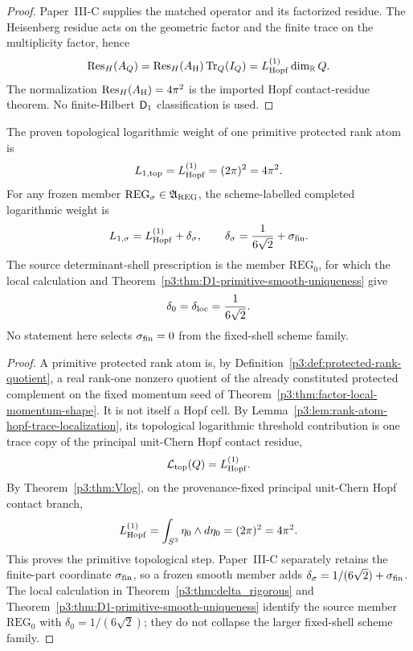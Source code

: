 \documentclass[12pt,a4paper]{article}
\begin{document}
\begin{proof}
Paper~III-C supplies the matched operator and its factorized residue.  The
Heisenberg residue acts on the geometric factor and the finite trace on the
multiplicity factor, hence
\[
 \operatorname{Res}_{H}(A_Q)
 =\operatorname{Res}_{H}(A_{\rm H})\operatorname{Tr}_Q(I_Q)
 =L_{\mathrm{Hopf}}^{(1)}\dim_{\mathbb R}Q.
\]
The normalization \(\operatorname{Res}_{H}(A_{\rm H})=4\pi^2\) is the
imported Hopf contact-residue theorem.  No finite-Hilbert \(\mathsf{D}_1\)
classification is used.
\end{proof}

\begin{lemma}
\label{p3:lem:primitive-hopf-cell-normalization}
The proven topological logarithmic weight of one primitive protected rank atom is
\[
L_{1,{\rm top}}=L_{\mathrm{Hopf}}^{(1)}=(2\pi)^2=4\pi^2.
\]
For any frozen member \(\mathrm{REG}_{\sigma}\in\mathfrak A_{\rm REG}\), the
scheme-labelled completed logarithmic weight is
\[
 L_{1,\sigma}=L_{\mathrm{Hopf}}^{(1)}+\delta_\sigma,
 \qquad
 \delta_\sigma=\frac1{6\sqrt2}+\sigma_{\rm fin}.
\]
The source determinant-shell prescription is the member
\(\mathrm{REG}_0\), for which the local calculation and
Theorem~\ref{p3:thm:D1-primitive-smooth-uniqueness} give
\[
 \delta_0=\delta_{\rm loc}=\frac1{6\sqrt2}.
\]
No statement here selects \(\sigma_{\rm fin}=0\) from the fixed-shell scheme
family.
\end{lemma}

\begin{proof}
A primitive protected rank atom is, by
Definition~\ref{p3:def:protected-rank-quotient}, a real rank-one nonzero
quotient of the already constituted protected complement on the fixed momentum
seed of Theorem~\ref{p3:thm:factor-local-momentum-shape}.
It is not itself a Hopf cell.  By Lemma~\ref{p3:lem:rank-atom-hopf-trace-localization},
its topological logarithmic threshold contribution is one trace copy of the
principal unit-Chern Hopf contact residue,
\[
\mathcal L_{\rm top}(Q)=L_{\mathrm{Hopf}}^{(1)}.
\]
By Theorem~\ref{p3:thm:Vlog}, on the provenance-fixed principal unit-Chern
Hopf contact branch,
\[
L_{\mathrm{Hopf}}^{(1)}=\int_{S^3}\eta_0\wedge d\eta_0=(2\pi)^2=4\pi^2.
\]
This proves the primitive topological step.  Paper~III-C separately retains
the finite-part coordinate \(\sigma_{\rm fin}\), so a frozen smooth member
adds \(\delta_\sigma=1/(6\sqrt2)+\sigma_{\rm fin}\).  The local calculation
in Theorem~\ref{p3:thm:delta_rigorous} and
Theorem~\ref{p3:thm:D1-primitive-smooth-uniqueness} identify the source member
\(\mathrm{REG}_0\) with \(\delta_0=1/(6\sqrt2)\); they do not collapse the
larger fixed-shell scheme family.
\end{proof}
\end{document}
